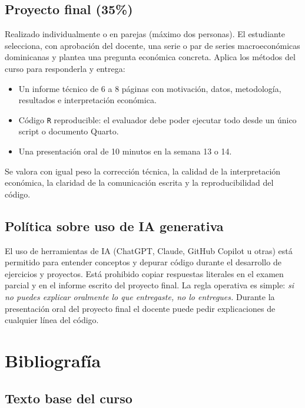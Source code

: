 \documentclass[11pt,letterpaper]{article}
\begin{document}
\subsection*{Proyecto final (35\%)}

Realizado individualmente o en parejas (máximo dos personas). El estudiante selecciona, con aprobación del docente, una serie o par de series macroeconómicas dominicanas y plantea una pregunta económica concreta. Aplica los métodos del curso para responderla y entrega:

\begin{itemize}[leftmargin=*, itemsep=0.15em]
  \item Un informe técnico de 6 a 8 páginas con motivación, datos, metodología, resultados e interpretación económica.
  \item Código \texttt{R} reproducible: el evaluador debe poder ejecutar todo desde un único script o documento Quarto.
  \item Una presentación oral de 10 minutos en la semana 13 o 14.
\end{itemize}

Se valora con igual peso la corrección técnica, la calidad de la interpretación económica, la claridad de la comunicación escrita y la reproducibilidad del código.

\subsection*{Política sobre uso de IA generativa}

El uso de herramientas de IA (ChatGPT, Claude, GitHub Copilot u otras) está permitido para entender conceptos y depurar código durante el desarrollo de ejercicios y proyectos. Está prohibido copiar respuestas literales en el examen parcial y en el informe escrito del proyecto final. La regla operativa es simple: \emph{si no puedes explicar oralmente lo que entregaste, no lo entregues.} Durante la presentación oral del proyecto final el docente puede pedir explicaciones de cualquier línea del código.

\section{Bibliografía}

\subsection{Texto base del curso}
\end{document}
